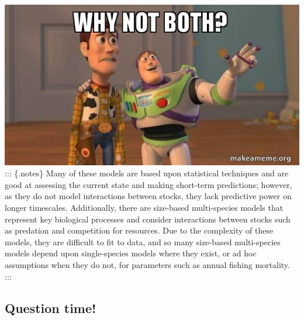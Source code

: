 \documentclass[
  letterpaper,
  DIV=11,
  numbers=noendperiod]{scrartcl}
\begin{document}
\includegraphics{images/whynotboth.png} ::: \{.notes\} Many of these
models are based upon statistical techniques and are good at assessing
the current state and making short-term predictions; however, as they do
not model interactions between stocks, they lack predictive power on
longer timescales. Additionally, there are size-based multi-species
models that represent key biological processes and consider interactions
between stocks such as predation and competition for resources. Due to
the complexity of these models, they are difficult to fit to data, and
so many size-based multi-species models depend upon single-species
models where they exist, or ad hoc assumptions when they do not, for
parameters such as annual fishing mortality. :::

\hypertarget{question-time}{%
\subsection{Question time!}\label{question-time}}
\end{document}
